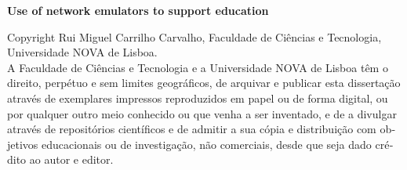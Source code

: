 \cleardoublepage\thispagestyle{empty}
\null
\vfill
\noindent\textbf{Use of network emulators to support education}

\foreignlanguage{portuguese}{\noindent Copyright \textcopyright\xspace Rui Miguel Carrilho Carvalho, Faculdade de Ciências e Tecnologia, Universidade NOVA de Lisboa.\\
A Faculdade de Ciências e Tecnologia e a Universidade NOVA de Lisboa têm o direito, perpétuo e sem limites geográficos, de arquivar e publicar esta dissertação através de exemplares impressos reproduzidos em papel ou de forma digital, ou por qualquer outro meio conhecido ou que venha a ser inventado, e de a divulgar através de repositórios científicos e de admitir a sua cópia e distribuição com objetivos educacionais ou de investigação, não comerciais, desde que seja dado crédito ao autor e editor.}
